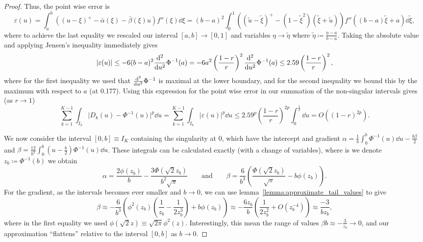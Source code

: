\documentclass[manuscript,review]{acmart}
\begin{document}
\begin{proof}
Thus, the point wise error is 
\begin{equation*}
\varepsilon(u)  = \int_{a}^{b} ((u - \xi)^+ - \bar{\alpha}(\xi) - \bar{\beta}(\xi) u ) f''(\xi) \dd{\xi} = (b - a)^2 \int_{0}^{1} ((\tilde{u} - \tilde{\xi})^+ - (1 - \tilde{\xi}^2)(\tilde{\xi} + \tilde{u})) f''((b - a)\tilde{\xi} + a) \dd{\tilde{\xi}},
\end{equation*}
where to achieve the last equality we rescaled our interval $ [a, b] \to [0, 1] $  and variables $ \eta \to \tilde{\eta}  $ where $ \tilde{\eta} \coloneqq \tfrac{\eta - a}{b - a} $. Taking the absolute value and applying Jensen's inequality immediately gives 
\begin{equation*}
\lvert \varepsilon(u) \rvert \leq - 6 (b - a)^2  {\dv[2]{}{u}}\Phi^{-1}(a) = - 6 a^2 \left(\dfrac{1-r}{r}\right)^2  {\dv[2]{}{u}}\Phi^{-1}(a) \leq 2.59 \left(\dfrac{1-r}{r}\right)^2,
\end{equation*}
where for the first inequality we used that $ {\dv[2]{}{u}}\Phi^{-1} $ is maximal at the lower boundary, and for the second inequality we bound this by the maximum with respect to $ a $ (at 0.177). Using this expression for the point wise error in our summation of the non-singular intervals gives (as $ r \to 1 $)
\begin{equation*}
 \sum_{k=1}^{K-1} \int_{I_k} \lvert D_k(u) - \Phi^{-1}(u)\rvert^p \dd{u}
= \sum_{k = 1}^{K - 1} \int_{I_k} \lvert\varepsilon(u)\rvert^p \dd{u}
\leq 2.59^p \left(\dfrac{1 - r}{r}\right)^{2p}  \int_{0}^{\frac{1}{2}} \dd{u}
= O((1-r)^{2p}).
\end{equation*}

We now consider the interval $ [0, b] \equiv I_K $ containing the singularity at 0, which have the intercept and gradient
$ \alpha = \tfrac{1}{b} \int_{0}^{b} \Phi^{-1}(u) \dd{u} - \tfrac{b\beta}{2}  $
and 
$ \beta  = \tfrac{12}{b^3} \int_{0}^{b} (u - \tfrac{b}{2}) \Phi^{-1}(u) \dd{u} $.
These integrals can be calculated exactly (with a change of variables), where is we denote $ z_b \coloneqq \Phi^{-1}(b) $ we obtain
\begin{equation*}
\alpha = \dfrac{2\phi(z_b)}{b} - \dfrac{3\Phi(\sqrt{2}z_b)}{b^2\sqrt{\pi}}
\qquad \text{and} \qquad 
\beta  = \dfrac{6}{b^3} \left(\dfrac{\Phi(\sqrt{2} z_b)}{\sqrt{\pi}} - b\phi(z_b)\right).
\end{equation*}
For the gradient, as the intervals becomes ever smaller and $ b \to 0 $, we can use lemma~\ref{lemma:approximate_tail_values} to give
\begin{equation*}
\beta  
\approx -\dfrac{6}{b^3} \left(\phi^2(z_b)\left(\dfrac{1}{z_b} - \dfrac{1}{2 z_b^3}\right) + b \phi(z_b)\right)
\approx -\dfrac{6z_b}{b}\left(\dfrac{1}{2z_b^2} + O(z_b^{-4})\right)
\approx \dfrac{-3}{bz_b},
\end{equation*}
where in the first equality we used  $ \phi(\sqrt{2}z) \equiv \sqrt{2\pi}\phi^2(z) $. Interestingly, this mean the range of values $ \beta b \approx -\tfrac{3}{z_b} \to 0 $, and our approximation ``flattens'' relative to the interval $ [0, b] $ as $ b \to 0 $.


\end{proof}
\end{document}
